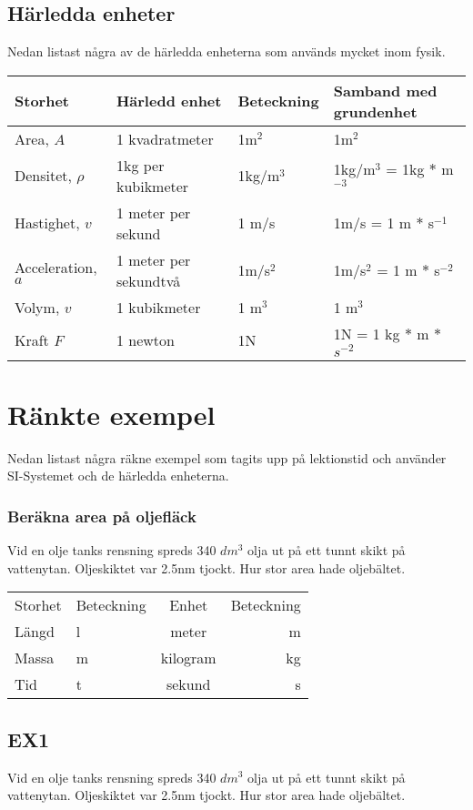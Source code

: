 \documentclass[a4paper,11pt]{article}
\begin{document}
\begin{flushleft}
\subsection{Härledda enheter}
Nedan listast några av de härledda enheterna som används mycket inom fysik.
\begin{tabular}{llll}
Storhet & Härledd enhet & Beteckning & Samband med grundenhet \\\hline
Area, $A$ & 1 kvadratmeter & 1m$^2$ & 1m$^2$ \\\hline
Densitet, $\rho$ & 1kg per kubikmeter & 1kg/m$^3$ & 1kg/m$^3$ = 1kg $*$ m$^{-3}$ \\\hline
Hastighet, $v$ & 1 meter per sekund & 1 m/s & 1m/s = 1 m $*$ s$^{-1}$ \\ \hline
Acceleration, $a$& 1 meter per sekundtvå & 1m/s$^2$ & 1m/s$^2$ = 1 m $*$ s$^{-2}$ \\ \hline
Volym, $v$ & 1 kubikmeter & 1 m$^3 $ & 1 m$^3 $ \\ \hline
Kraft $F$ & 1 newton & 1N & 1N = 1 kg $*$ m $*$ $s^{-2}$
\end{tabular}
\newpage
\section{Ränkte exempel}
Nedan listast några räkne exempel som tagits upp på lektionstid och använder SI-Systemet och de härledda enheterna.

\subsubsection{Beräkna area på oljefläck}
Vid en olje tanks rensning spreds 340 $ dm^3 $ olja ut på ett tunnt skikt på vattenytan.
Oljeskiktet var 2.5nm tjockt.\newline
Hur stor area hade oljebältet.
\newline

\begin{tabular}{l l | c r}
  Storhet & Beteckning & Enhet & Beteckning\\
  Längd & l & meter & m\\
  Massa & m & kilogram & kg\\
  Tid & t & sekund & s\\
\end{tabular}


\subsection{EX1} Vid en olje tanks rensning spreds 340 $ dm^3 $ olja ut på ett tunnt skikt på vattenytan.
Oljeskiktet var 2.5nm tjockt.\newline
Hur stor area hade oljebältet.
\newline


\end{flushleft}
\end{document}
